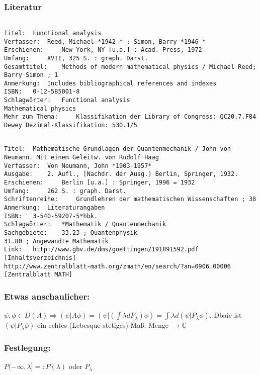 \documentclass[twoside,a4paper]{scrartcl}
\newcommand{\C}{\mathbb{C}}
\renewcommand{\1}{\mathds{1}}
\newcommand{\Ra}{\Rightarrow}
\newcommand{\ra}{\rightarrow}
\renewcommand{\C}{\mathbb{C}}
\begin{document}
\subsubsection*{Literatur}
\begin{tiny}
\begin{verbatim}

Titel: 	Functional analysis
Verfasser: 	Reed, Michael *1942-* ; Simon, Barry *1946-*
Erschienen: 	New York, NY [u.a.] : Acad. Press, 1972
Umfang: 	XVII, 325 S. : graph. Darst.
Gesamttitel: 	Methods of modern mathematical physics / Michael Reed; Barry Simon ; 1
Anmerkung: 	Includes bibliographical references and indexes
ISBN: 	0-12-585001-8
Schlagwörter: 	Functional analysis
Mathematical physics
Mehr zum Thema: 	Klassifikation der Library of Congress: QC20.7.F84
Dewey Dezimal-Klassifikation: 530.1/5
\end{verbatim}
\end{tiny}

\begin{tiny}
\begin{verbatim}

Titel: 	Mathematische Grundlagen der Quantenmechanik / John von Neumann. Mit einem Geleitw. von Rudolf Haag
Verfasser: 	Von Neumann, John *1903-1957*
Ausgabe: 	2. Aufl., [Nachdr. der Ausg.] Berlin, Springer, 1932.
Erschienen: 	Berlin [u.a.] : Springer, 1996 = 1932
Umfang: 	262 S. : graph. Darst.
Schriftenreihe: 	Grundlehren der mathematischen Wissenschaften ; 38
Anmerkung: 	Literaturangaben
ISBN: 	3-540-59207-5*hbk.
Schlagwörter: 	*Mathematik / Quantenmechanik
Sachgebiete: 	33.23 ; Quantenphysik
31.80 ; Angewandte Mathematik
Link: 	http://www.gbv.de/dms/goettingen/191891592.pdf [Inhaltsverzeichnis]
http://www.zentralblatt-math.org/zmath/en/search/?an=0906.00006 [Zentralblatt MATH]
\end{verbatim}
\end{tiny}


\subsubsection*{Etwas anschaulicher:}
$\psi, \phi \in D(A) \Ra (\psi|A\phi)=(\psi|(\int \lambda dP_\lambda)\phi)=\int \lambda d(\psi|P_\lambda \phi)$. Dbaie ist $(\psi|P_\lambda \phi)$ ein echtes (Lebesque-stetiges) Maß: Menge $\ra \C$

\subsubsection*{Festlegung:}
$P(-\infty, \lambda]=:P(\lambda)$ oder $P_\lambda$
\end{document}
